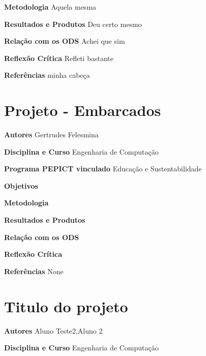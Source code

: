 \documentclass[12pt,openright,oneside,a4paper]{report}
\begin{document}
\vspace{0.7cm}
\noindent
\textbf{Metodologia}
Aquela mesma

\vspace{0.7cm}
\noindent
\textbf{Resultados e Produtos}
Deu certo mesmo

\vspace{0.7cm}
\noindent
\textbf{Relação com os ODS}
Achei que sim

\vspace{0.7cm}
\noindent
\textbf{Reflexão Crítica}
Refleti bastante

\vspace{0.7cm}
\noindent
\textbf{Referências}
minha cabeça

\vspace{0.7cm}
\newpage
\section{Projeto - Embarcados}
\noindent
\textbf{Autores}
Gertrudes Felesmina

\vspace{0.7cm}
\noindent
\textbf{Disciplina e Curso}
Engenharia de Computação

\vspace{0.7cm}
\noindent
\textbf{Programa PEPICT vinculado}
Educação e Sustentabilidade

\vspace{0.7cm}
\noindent
\textbf{Objetivos}


\vspace{0.7cm}
\noindent
\textbf{Metodologia}


\vspace{0.7cm}
\noindent
\textbf{Resultados e Produtos}


\vspace{0.7cm}
\noindent
\textbf{Relação com os ODS}


\vspace{0.7cm}
\noindent
\textbf{Reflexão Crítica}


\vspace{0.7cm}
\noindent
\textbf{Referências}
None

\vspace{0.7cm}
\newpage
\section{Titulo do projeto}
\noindent
\textbf{Autores}
Aluno Teste2,Aluno 2

\vspace{0.7cm}
\noindent
\textbf{Disciplina e Curso}
Engenharia de Computação
\end{document}

